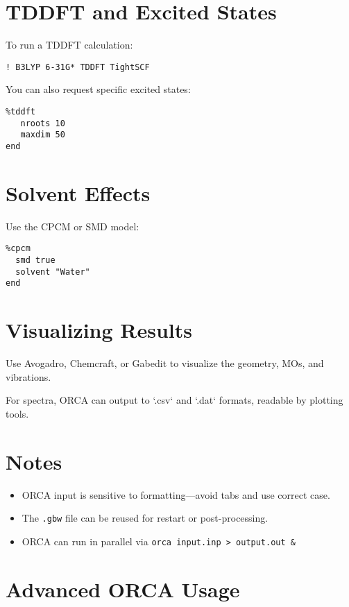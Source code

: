 \section{TDDFT and Excited States}

To run a TDDFT calculation:

\begin{verbatim}
! B3LYP 6-31G* TDDFT TightSCF
\end{verbatim}

You can also request specific excited states:

\begin{verbatim}
%tddft
   nroots 10
   maxdim 50
end
\end{verbatim}

\section{Solvent Effects}

Use the CPCM or SMD model:

\begin{verbatim}
%cpcm
  smd true
  solvent "Water"
end
\end{verbatim}

\section{Visualizing Results}

Use Avogadro, Chemcraft, or Gabedit to visualize the geometry, MOs, and vibrations.

For spectra, ORCA can output to `.csv` and `.dat` formats, readable by plotting tools.

\section*{Notes}
\begin{itemize}
    \item ORCA input is sensitive to formatting—avoid tabs and use correct case.
    \item The \texttt{.gbw} file can be reused for restart or post-processing.
    \item ORCA can run in parallel via \texttt{orca input.inp > output.out &}
\end{itemize}


\section*{Advanced ORCA Usage}

